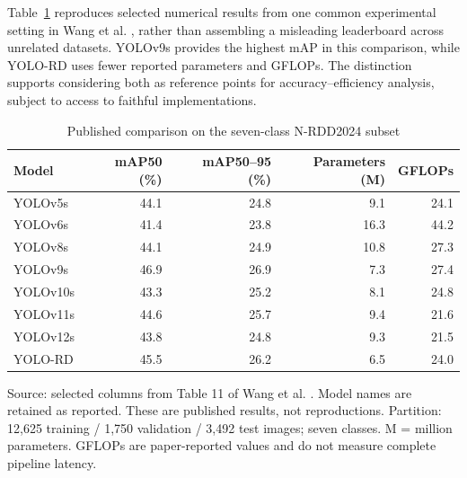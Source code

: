 \documentclass[11pt,a4paper]{article}
\begin{document}
Table~\ref{tab:comparison} reproduces selected numerical results from one common experimental setting in Wang et al. \cite{r3}, rather than assembling a misleading leaderboard across unrelated datasets. YOLOv9s provides the highest mAP in this comparison, while YOLO-RD uses fewer reported parameters and GFLOPs. The distinction supports considering both as reference points for accuracy--efficiency analysis, subject to access to faithful implementations.

\begin{table}[!htbp]\centering\small
\caption{Published comparison on the seven-class N-RDD2024 subset}\label{tab:comparison}

\begin{tabular*}{\textwidth}{@{\extracolsep{\fill}}lrrrr@{}}
\toprule

\textbf{Model} & \textbf{mAP50 (\%)} & \textbf{mAP50--95 (\%)} & \textbf{Parameters (M)} & \textbf{GFLOPs} \\ \midrule

YOLOv5s & 44.1 & 24.8 & 9.1 & 24.1 \\

YOLOv6s & 41.4 & 23.8 & 16.3 & 44.2 \\

YOLOv8s & 44.1 & 24.9 & 10.8 & 27.3 \\

YOLOv9s & 46.9 & 26.9 & 7.3 & 27.4 \\

YOLOv10s & 43.3 & 25.2 & 8.1 & 24.8 \\

YOLOv11s & 44.6 & 25.7 & 9.4 & 21.6 \\

YOLOv12s & 43.8 & 24.8 & 9.3 & 21.5 \\

YOLO-RD & 45.5 & 26.2 & 6.5 & 24.0 \\

\bottomrule
\end{tabular*}
\par\vspace{5pt}\begin{minipage}{\textwidth}\footnotesize\raggedright Source: selected columns from Table 11 of Wang et al. \cite{r3}. Model names are retained as reported. These are published results, not reproductions. Partition: 12,625 training / 1,750 validation / 3,492 test images; seven classes. M = million parameters. GFLOPs are paper-reported values and do not measure complete pipeline latency.\end{minipage}\end{table}
\end{document}

